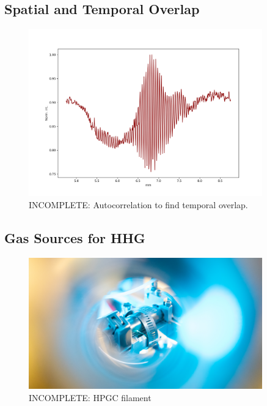 \subsection{Spatial and Temporal Overlap}
\label{sec:temporal_overlap}

\begin{figure}
	\centering
	\includegraphics[width=0.9\textwidth]{figures/Beamline/Overlap_camera.png}
	\caption{INCOMPLETE: Autocorrelation to find temporal overlap.}
	\label{fig:fine_scan_temporal_overlap}
\end{figure}

\subsection{Gas Sources for HHG}
\label{sec:gas_source}
\begin{figure}
	\centering
	\includegraphics[width=0.9\textwidth]{figures/Beamline/high_pressure_cell_filament.jpg}
	\caption{INCOMPLETE: HPGC filament}
	\label{fig:HPGC_filament}
\end{figure}

